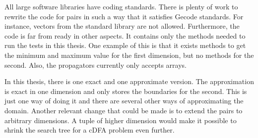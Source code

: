 \documentclass[a4paper,11pt]{article}
\begin{document}
All large software libraries have coding standards. There is plenty of work to rewrite the code for pairs in such a way that it satisfies Gecode standards. For instance, vectors from the standard library are not allowed. Furthermore, the code is far from ready in other aspects. It contains only the methods needed to run the tests in this thesis. One example of this is that it exists methods to get the minimum and maximum value for the first dimension, but no methods for the second. Also, the propagators currently only accepts arrays. 

In this thesis, there is one exact and one approximate version. The approximation is exact in one dimension and only stores the boundaries for the second. This is just one way of doing it and there are several other ways of approximating the domain. Another relevant change that could be made is to extend the pairs to arbitrary dimensions. A tuple of higher dimension would make it possible to shrink the search tree for a cDFA problem even further.





%
%
%
%
\end{document}
